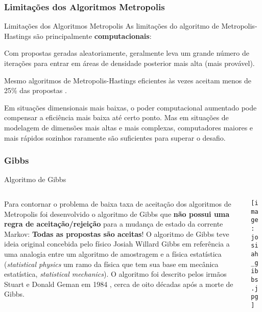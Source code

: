 \subsubsection{Limitações dos Algoritmos Metropolis}
\begin{frame}{Limitações dos Algoritmos Metropolis}
  As limitações do algoritmo de Metropolis-Hastings são principalmente
  \textbf{computacionais}:
  \begin{vfilleditems}
    \item Com propostas geradas aleatoriamente, geralmente leva um grande número de
    iterações para entrar em áreas de densidade posterior mais alta (mais provável).

    \item Mesmo algoritmos de Metropolis-Hastings eficientes às vezes aceitam menos de
    25\% das propostas \parencite{robertsWeakConvergenceOptimal1997, beskosOptimalTuningHybrid2013}.

    \item Em situações dimensionais mais baixas, o poder computacional aumentado pode compensar a eficiência mais baixa até certo ponto.
    Mas em situações de modelagem de dimensões mais altas e mais complexas, computadores maiores
    e mais rápidos sozinhos raramente são suficientes para superar o desafio.
  \end{vfilleditems}
\end{frame}

\subsubsection{Gibbs}
\begin{frame}{Algoritmo de Gibbs}
  \begin{columns}
    \begin{column}{0.8\textwidth}
      Para contornar o problema de baixa taxa de aceitação dos algoritmos de Metropolis
      foi desenvolvido o algoritmo de Gibbs que
      \textbf{não possui uma regra de aceitação/rejeição}
      para a mudança de estado da corrente Markov:
      \textbf{Todas as propostas são aceitas}!
      \vfill
      O algoritmo de Gibbs teve ideia original concebida pelo físico Josiah Willard Gibbs
      em referência a uma analogia entre um algoritmo de amostragem e a
      física estatística (\textit{statistical physics} um ramo da física que tem sua
      base em mecânica estatística, \textit{statistical mechanics}).
      O algoritmo foi descrito pelos irmãos Stuart e Donald Geman em 1984
      \parencite{gemanStochasticRelaxationGibbs1984}, cerca de oito décadas após
      a morte de Gibbs.
    \end{column}
    \begin{column}{0.2\textwidth}
      \texttt{[image: josiah\_gibbs.jpg]}
    \end{column}
  \end{columns}
\end{frame}

